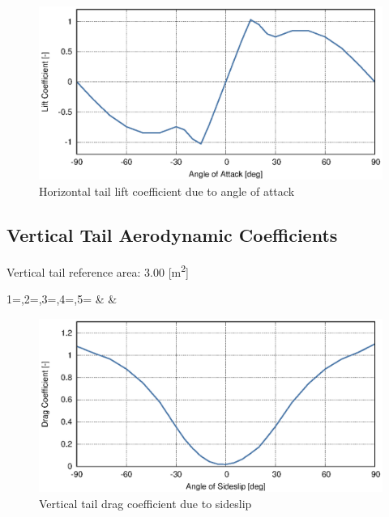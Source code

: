 \begin{figure}
  \centering
  \includegraphics[width=140mm]{eps/uh60_stab_h_cz.eps}
  \caption{Horizontal tail lift coefficient due to angle of attack \cite{NASA-CR-166309}}
\end{figure}

\clearpage
\subsection{Vertical Tail Aerodynamic Coefficients}

Vertical tail reference area: 3.00 [m\textsuperscript{2}]

{1=\colbeta,2=\colhcx,3=\colhcz,4=\colvcx,5=\colvcy}
{\colbeta & \colvcx & \colvcy}

\begin{figure}
  \centering
  \includegraphics[width=140mm]{eps/uh60_stab_v_cx.eps}
  \caption{Vertical tail drag coefficient due to sideslip \cite{NASA-CR-166309}}
\end{figure}

